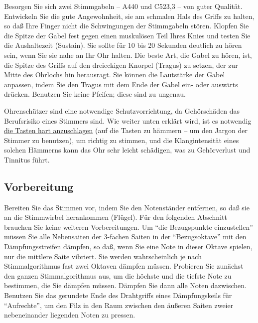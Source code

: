 \label{c2_3_gabel}

Besorgen Sie sich zwei Stimmgabeln -- A440 und C523,3 -- von guter Qualität.
Entwickeln Sie die gute Angewohnheit, sie am schmalen Hals des Griffs zu halten, so daß Ihre Finger nicht die Schwingungen der Stimmgabeln stören.
Klopfen Sie die Spitze der Gabel fest gegen einen muskulösen Teil Ihres Knies und testen Sie die Aushaltezeit (Sustain).
Sie sollte für 10 bis 20 Sekunden deutlich zu hören sein, wenn Sie sie nahe an Ihr Ohr halten.
Die beste Art, die Gabel zu hören, ist, die Spitze des Griffs auf den dreieckigen Knorpel (Tragus) zu setzen, der zur Mitte des Ohrlochs hin herausragt.
Sie können die Lautstärke der Gabel anpassen, indem Sie den Tragus mit dem Ende der Gabel ein- oder auswärts drücken.
Benutzen Sie keine Pfeifen; diese sind zu ungenau.

Ohrenschützer sind eine notwendige Schutzvorrichtung, da Gehörschäden das Berufsrisiko eines Stimmers sind.
Wie weiter unten erklärt wird, ist es notwendig \hyperref[c2_5_infi]{die Tasten hart anzuschlagen} (auf die Tasten zu hämmern -- um den Jargon der Stimmer zu benutzen), um richtig zu stimmen, und die Klangintensität eines solchen Hämmerns kann das Ohr sehr leicht schädigen, was zu Gehörverlust und Tinnitus führt.
 

\subsection{Vorbereitung}
\label{c2_4}

Bereiten Sie das Stimmen vor, indem Sie den Notenständer entfernen, so daß sie an die Stimmwirbel herankommen (Flügel).
Für den folgenden Abschnitt brauchen Sie keine weiteren Vorbereitungen.
Um \enquote{die Bezugspunkte einzustellen} müssen Sie alle Nebensaiten der 3-fachen Saiten in der \enquote{Bezugsoktave} mit den Dämpfungsstreifen dämpfen, so daß, wenn Sie eine Note in dieser Oktave spielen, nur die mittlere Saite vibriert.
Sie werden wahrscheinlich je nach Stimmalgorithmus fast zwei Oktaven dämpfen müssen.
Probieren Sie zunächst den ganzen Stimmalgorithmus aus, um die höchste und die tiefste Note zu bestimmen, die Sie dämpfen müssen.
Dämpfen Sie dann alle Noten dazwischen.
Benutzen Sie das gerundete Ende des Drahtgriffs eines Dämpfungskeils für \enquote{Aufrechte}, um den Filz in den Raum zwischen den äußeren Saiten zweier nebeneinander liegenden Noten zu pressen.
 


